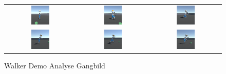 \begin{figure}[H]
  \centering
  \begin{tabular}{ccc}
    \includegraphics[width=0.27\textwidth]{img/walker_laufen1.png} & \includegraphics[width=0.27\textwidth]{img/walker_laufen2.png} & \includegraphics[width=0.27\textwidth]{img/walker_laufen3.png}\\
    \includegraphics[width=0.27\textwidth]{img/walker_laufen4.png} & \includegraphics[width=0.27\textwidth]{img/walker_laufen5.png} & \includegraphics[width=0.27\textwidth]{img/walker_laufen6.png}\\
  \end{tabular}
  \caption{Walker Demo Analyse Gangbild}
  \label{fig:analyse_gangbild}
\end{figure}
  